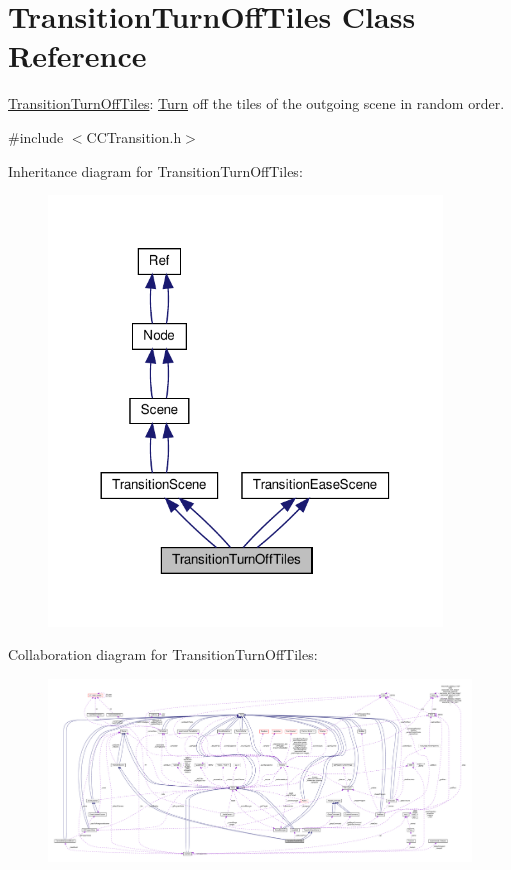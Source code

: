 \hypertarget{classTransitionTurnOffTiles}{}\section{Transition\+Turn\+Off\+Tiles Class Reference}
\label{classTransitionTurnOffTiles}


\hyperlink{classTransitionTurnOffTiles}{Transition\+Turn\+Off\+Tiles}\+: \hyperlink{classTurn}{Turn} off the tiles of the outgoing scene in random order.  




{\ttfamily \#include $<$C\+C\+Transition.\+h$>$}



Inheritance diagram for Transition\+Turn\+Off\+Tiles\+:
\nopagebreak
\begin{figure}[H]
\begin{center}
\leavevmode
\includegraphics[width=296pt]{classTransitionTurnOffTiles__inherit__graph}
\end{center}
\end{figure}


Collaboration diagram for Transition\+Turn\+Off\+Tiles\+:
\nopagebreak
\begin{figure}[H]
\begin{center}
\leavevmode
\includegraphics[width=350pt]{classTransitionTurnOffTiles__coll__graph}
\end{center}
\end{figure}
